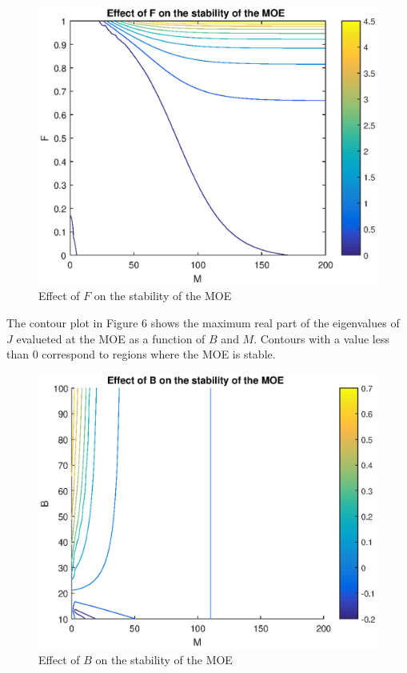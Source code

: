 \documentclass[11pt, oneside]{article}    %
\begin{document}
\begin{figure}[H]
\centering
\includegraphics[scale=0.65]{F_M_cont.eps}
\caption{Effect of $F$ on the stability of the MOE}
\end{figure}

The contour plot in Figure 6 shows the maximum real part of the eigenvalues of $J$ evalueted at the MOE as a function of $B$ and $M$. Contours with a value less than 0 correspond to regions where the MOE is stable.

\begin{figure}[H]
\centering
\includegraphics[scale=0.65]{B_M_cont.eps}
\caption{Effect of $B$ on the stability of the MOE}
\end{figure}
\end{document}

